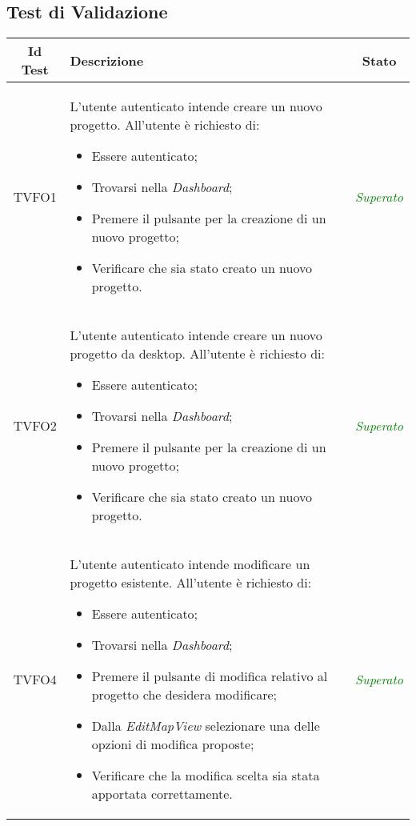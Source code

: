 \subsection{Test di Validazione}

\normalsize
\begin{longtable}{|c|>{}m{8cm}|c|}
\hline 
\textbf{Id Test} & \textbf{Descrizione} & \textbf{Stato}\\
\hline
\endhead
\hypertarget{TVFO1}{TVFO1} & L'utente autenticato intende creare un nuovo progetto.
All'utente è richiesto di:
\begin{itemize}
	\item Essere autenticato;
	\item Trovarsi nella \textit{Dashboard};
	\item Premere il pulsante per la creazione di un nuovo progetto;
	\item Verificare che sia stato creato un nuovo progetto.
\end{itemize} & \textcolor{Green}{\textit{Superato}}\\ \hline
\hypertarget{TVFO2}{TVFO2} & L'utente autenticato intende creare un nuovo progetto da desktop.
All'utente è richiesto di:
\begin{itemize}
	\item Essere autenticato;
	\item Trovarsi nella \textit{Dashboard};
	\item Premere il pulsante per la creazione di un nuovo progetto;
	\item Verificare che sia stato creato un nuovo progetto.
\end{itemize} & \textcolor{Green}{\textit{Superato}}\\ \hline
\hypertarget{TVFO4}{TVFO4} & L'utente autenticato intende modificare un progetto esistente.
All'utente è richiesto di:
\begin{itemize}
	\item Essere autenticato;
	\item Trovarsi nella \textit{Dashboard};
        \item Premere il pulsante di modifica relativo al progetto che desidera modificare;
	\item Dalla \textit{EditMapView} selezionare una delle opzioni di modifica proposte;
	\item Verificare che la modifica scelta sia stata apportata correttamente.
\end{itemize} & \textcolor{Green}{\textit{Superato}}\\ \hline

\end{longtable}
